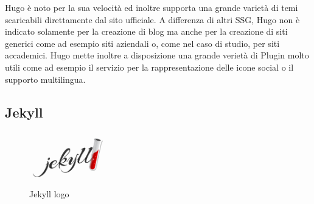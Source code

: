 \documentclass[target=bach,aauheader=]{thud}
\begin{document}
Hugo è noto per la sua velocità ed inoltre supporta una grande varietà di temi scaricabili direttamente dal sito ufficiale. A differenza di altri SSG, Hugo non è indicato solamente per la creazione di blog
ma anche per la creazione di siti generici come ad esempio siti aziendali o, come nel caso di studio, per siti accademici. 
Hugo mette inoltre a disposizione una grande verietà di Plugin molto utili come ad esempio il servizio per la rappresentazione delle icone social o il supporto multilingua. 

\subsection{Jekyll}
\begin{figure}
    \centering
    \includegraphics[width = 0.3\textwidth]{images/jekyll_teaser.png}
    \caption{Jekyll logo}
\end{figure}
\end{document}
